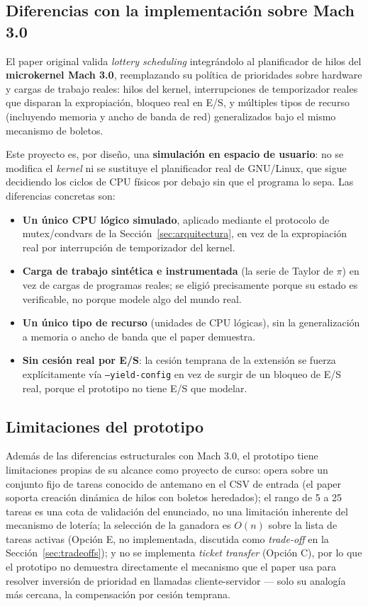 \subsection{Diferencias con la implementación sobre Mach 3.0}

El paper original valida \textit{lottery scheduling} integrándolo al
planificador de hilos del \textbf{microkernel Mach 3.0}, reemplazando su
política de prioridades sobre hardware y cargas de trabajo reales: hilos
del kernel, interrupciones de temporizador reales que disparan la
expropiación, bloqueo real en E/S, y múltiples tipos de recurso
(incluyendo memoria y ancho de banda de red) generalizados bajo el mismo
mecanismo de boletos.

Este proyecto es, por diseño, una \textbf{simulación en espacio de
usuario}: no se modifica el \textit{kernel} ni se sustituye el planificador
real de GNU/Linux, que sigue decidiendo los ciclos de CPU físicos por
debajo sin que el programa lo sepa. Las diferencias concretas son:

\begin{itemize}
\item \textbf{Un único CPU lógico simulado}, aplicado mediante el
  protocolo de mutex/condvars de la Sección~\ref{sec:arquitectura}, en vez
  de la expropiación real por interrupción de temporizador del kernel.
\item \textbf{Carga de trabajo sintética e instrumentada} (la serie de
  Taylor de $\pi$) en vez de cargas de programas reales; se eligió
  precisamente porque su estado es verificable, no porque modele algo del
  mundo real.
\item \textbf{Un único tipo de recurso} (unidades de CPU lógicas), sin la
  generalización a memoria o ancho de banda que el paper demuestra.
\item \textbf{Sin cesión real por E/S}: la cesión temprana de la extensión
  se fuerza explícitamente vía \texttt{--yield-config} en vez de surgir de
  un bloqueo de E/S real, porque el prototipo no tiene E/S que modelar.
\end{itemize}

\subsection{Limitaciones del prototipo}

Además de las diferencias estructurales con Mach 3.0, el prototipo tiene
limitaciones propias de su alcance como proyecto de curso: opera sobre un
conjunto fijo de tareas conocido de antemano en el CSV de entrada (el paper
soporta creación dinámica de hilos con boletos heredados); el rango de 5 a
25 tareas es una cota de validación del enunciado, no una limitación
inherente del mecanismo de lotería; la selección de la ganadora es
$O(n)$ sobre la lista de tareas activas (Opción E, no implementada,
discutida como \textit{trade-off} en la Sección~\ref{sec:tradeoffs}); y no
se implementa \textit{ticket transfer} (Opción C), por lo que el prototipo
no demuestra directamente el mecanismo que el paper usa para resolver
inversión de prioridad en llamadas cliente-servidor --- solo su analogía
más cercana, la compensación por cesión temprana.
